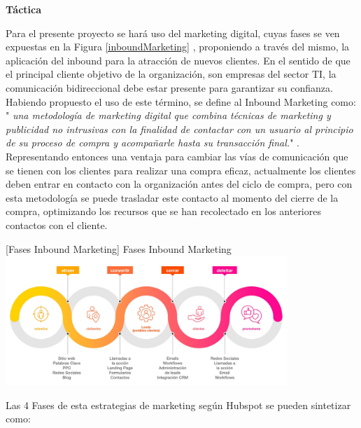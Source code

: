 \textbf{Táctica}

Para el presente proyecto se hará uso del marketing digital, cuyas fases se ven expuestas en la Figura \ref{inboundMarketing} , proponiendo a través del mismo, la aplicación del inbound para la atracción de nuevos clientes. En el sentido de que el principal cliente objetivo de la organización, son empresas del sector TI, la comunicación bidireccional debe estar presente para garantizar su confianza. Habiendo propuesto el uso de este término, se define al Inbound Marketing como: " \textit{una metodología de marketing digital que combina técnicas de marketing y publicidad no intrusivas con la finalidad de contactar con un usuario al principio de su proceso de compra y acompañarle hasta su transacción final.}" \cite{pauvaldes_2018}. Representando entonces una ventaja para cambiar las vías de comunicación que se tienen con los clientes para realizar una compra eficaz, actualmente los clientes deben entrar en contacto con la organización antes del ciclo de compra, pero con esta metodología se puede trasladar este contacto al momento del cierre de la compra, optimizando los recursos que se han recolectado en los anteriores contactos con el cliente.

\newline

\vspace{2mm}
        \begin{minipage}{0.9\textwidth}
        \centering
        [{Fases Inbound Marketing}]{ Fases Inbound Marketing  }
        \label{inboundMarketing}
         \includegraphics[width=0.8\textwidth]{Images/cms_inbound-marketingpng__YCPwBal20ZUUeH7LQ1Ze4XhRLfejrkRmN0YwTGOY.jpg}
\end{minipage}

Las 4 Fases de esta estrategias de marketing según Hubspot \cite{hubspot_2020} se pueden sintetizar como:


